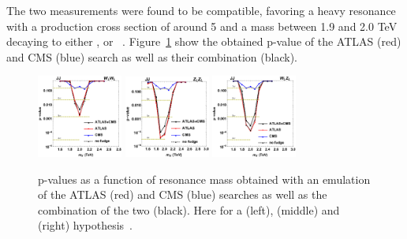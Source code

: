 The two measurements were found to be compatible, favoring a heavy resonance with a production cross section of around 5 \fbinv and a mass between 1.9 and 2.0 TeV decaying to either \PW\PW, \PW\PZ or \PZ\PZ~\cite{Dias:2015mhm}. Figure~\ref{fig:searchI:8tevcombo} show the obtained p-value of the ATLAS (red) and CMS (blue) search as well as their combination (black).  

\begin{figure}[ht] 
    \centering
    \includegraphics[width=0.25\textwidth]{figures/analysis/search1/misc/CMS_ATLAS_BulkWW_JJ_dijetfit_p.png}
    \includegraphics[width=0.25\textwidth]{figures/analysis/search1/misc/CMS_ATLAS_BulkZZ_JJ_dijetfit_p.png}
    \includegraphics[width=0.25\textwidth]{figures/analysis/search1/misc/CMS_ATLAS_WZ_JJ_dijetfit_p.png}
    \caption{p-values as a function of resonance mass obtained with an emulation of the ATLAS (red) and CMS (blue) searches as well as the combination of the two (black). Here for a \PW\PW (left), \PW\PZ (middle) and \PZ\PZ (right) hypothesis~\cite{Dias:2015mhm}.}
    \label{fig:searchI:8tevcombo}
\end{figure}

